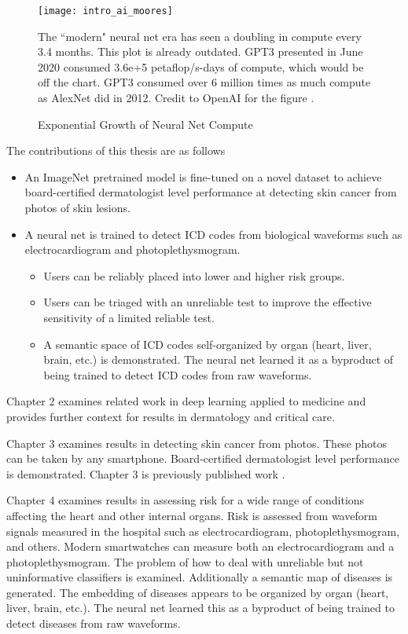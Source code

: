 \begin{figure}[h]
\texttt{[image: intro\_ai\_moores]}
\caption{Exponential Growth of Neural Net Compute}
\vspace{12px}
The ``modern" neural net era has seen a doubling in compute every 3.4 months.  This plot is already outdated.  GPT3 presented in June 2020 consumed 3.6e+5 petaflop/s-days of compute, which would be off the chart.  GPT3 consumed over 6 million times as much compute as AlexNet did in 2012.  Credit to OpenAI for the figure \cite{openai2018compute}.
\vspace{12px}
\label{fig:intro_ai_moores}
\end{figure}


The contributions of this thesis are as follows
\begin{itemize}
    \item An ImageNet pretrained model is fine-tuned on a novel dataset to achieve board-certified dermatologist level performance at detecting skin cancer from photos of skin lesions.
    \item A neural net is trained to detect ICD codes from biological waveforms such as electrocardiogram and photoplethysmogram.
    \begin{itemize}
        \item Users can be reliably placed into lower and higher risk groups.
        \item Users can be triaged with an unreliable test to improve the effective sensitivity of a limited reliable test.
        \item A semantic space of ICD codes self-organized by organ (heart, liver, brain, etc.) is demonstrated.  The neural net learned it as a byproduct of being trained to detect ICD codes from raw waveforms.
    \end{itemize}
\end{itemize}

Chapter 2 examines related work in deep learning applied to medicine and provides further context for results in dermatology and critical care.

Chapter 3 examines results in detecting skin cancer from photos.  These photos can be taken by any smartphone.  Board-certified dermatologist level performance is demonstrated.  Chapter 3 is previously published work \cite{kuprel2017dermatologist}.

Chapter 4 examines results in assessing risk for a wide range of conditions affecting the heart and other internal organs.  Risk is assessed from waveform signals measured in the hospital such as electrocardiogram, photoplethysmogram, and others.  Modern smartwatches can measure both an electrocardiogram and a photoplethysmogram.  The problem of how to deal with unreliable but not uninformative classifiers is examined.  Additionally a semantic map of diseases is generated.  The embedding of diseases appears to be organized by organ (heart, liver, brain, etc.).  The neural net learned this as a byproduct of being trained to detect diseases from raw waveforms.